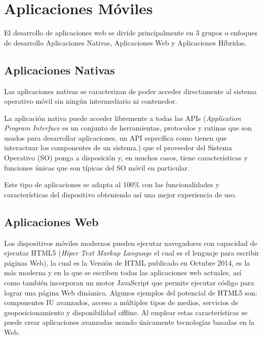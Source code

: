\section{Aplicaciones Móviles}
\label{cha:aplicaciones_moviles}

  El desarrollo de aplicaciones web se divide principalmente en 3 grupos o enfoques de desarrollo Aplicaciones Nativas, Aplicaciones Web y Aplicaciones Híbridas.

  \subsection{Aplicaciones Nativas}
  \label{sec:aplicaciones_nativas}

  Las aplicaciones nativas se caracterizan de poder acceder directamente al sistema operativo móvil sin ningún intermediario ni contenedor.

  La aplicación nativa puede acceder libremente a todas las APIs (\emph{Application Program Interface} es un conjunto de herramientas, protocolos y rutinas que son usados para desarrollar aplicaciones, un API específica como tienen que interactuar los componentes de un sistema.) que el proveedor del Sistema Operativo (SO) ponga a disposición y, en muchos casos, tiene características y funciones únicas que son típicas del SO móvil en particular.

  Este tipo de aplicaciones se adapta al 100\% con las funcionalidades y características del dispositivo obteniendo así una mejor experiencia de uso.


  \subsection{Aplicaciones Web}
  \label{sec:aplicaciones_web}

  Los dispositivos móviles modernos pueden ejecutar navegadores con capacidad de ejecutar HTML5 (\emph{Hiper Text Markup Language} el cual es el lenguaje para escribir páginas Web), la cual es la Versión de HTML publicado en Octubre 2014, es la más moderna y en la que se escriben todas las aplicaciones web actuales, así como también incorporan un motor JavaScript que permite ejecutar código para lograr una página Web dinámica. Algunos ejemplos del potencial de HTML5 son: componentes IU avanzados, acceso a múltiples tipos de medios, servicios de geoposicionamiento y disponibilidad offline. Al emplear estas características se puede crear aplicaciones avanzadas usando únicamente tecnologías basadas en la Web.\\

